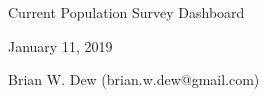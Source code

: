 \documentclass{report}
\begin{document}
Current Population Survey Dashboard

January 11, 2019

Brian W. Dew (brian.w.dew@gmail.com)
\end{document}
